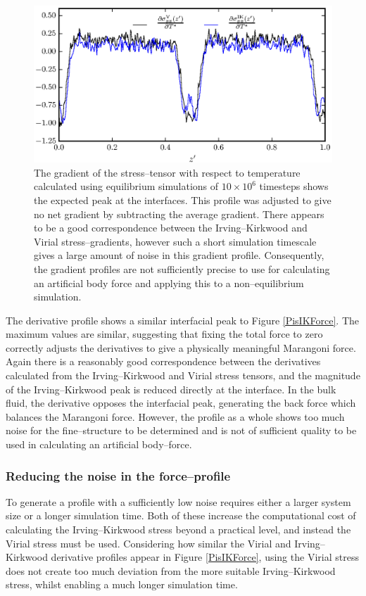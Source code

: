 \begin{figure}[h]
\centering
\includegraphics[scale=0.8]{Period10Force}
\caption{The gradient of the stress--tensor with respect to temperature calculated using equilibrium simulations of $10 \times 10^{6}$ timesteps shows the expected peak at the interfaces. 
This profile was adjusted to give no net gradient by subtracting the average gradient.
There appears to be a good correspondence between the Irving--Kirkwood and Virial stress--gradients, however such a short simulation timescale gives a large amount of noise in this gradient profile.
Consequently, the gradient profiles are not sufficiently precise to use for calculating an artificial body force and applying this to a non--equilibrium simulation.
}
\label{Period10Force}
\end{figure}
The derivative profile shows a similar interfacial peak to Figure \ref{PisIKForce}. 
The maximum values are similar, suggesting that fixing the total force to zero correctly adjusts the derivatives to give a physically meaningful Marangoni force.
Again there is a reasonably good correspondence between the derivatives calculated from the Irving--Kirkwood and Virial stress tensors, and the magnitude of the Irving--Kirkwood peak is reduced directly at the interface.
In the bulk fluid, the derivative opposes the interfacial peak, generating the back force which balances the Marangoni force.
However, the profile as a whole shows too much noise for the fine--structure to be determined and is not of sufficient quality to be used in calculating an artificial body--force.

\subsubsection{Reducing the noise in the force--profile}
To generate a profile with a sufficiently low noise requires either a larger system size or a longer simulation time.
Both of these increase the computational cost of calculating the Irving--Kirkwood stress beyond a practical level, and instead the Virial stress must be used.
Considering how similar the Virial and Irving--Kirkwood derivative profiles appear in Figure \ref{PisIKForce}, using the Virial stress does not create too much deviation from the more suitable Irving--Kirkwood stress, whilst enabling a much longer simulation time.
\FloatBarrier

